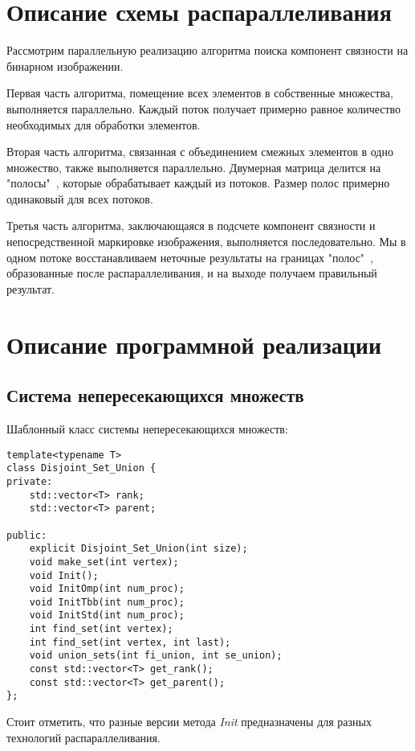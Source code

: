 \documentclass{report}
\begin{document}

\newpage
\section*{Описание схемы распараллеливания}
\par Рассмотрим параллельную реализацию алгоритма поиска компонент связности на бинарном изображении.
\par Первая часть алгоритма, помещение всех элементов в собственные множества, выполняется параллельно. Каждый поток получает примерно равное количество необходимых для обработки элементов.
\par Вторая часть алгоритма, связанная с объединением смежных элементов в одно множество, также выполняется параллельно. Двумерная матрица делится на "полосы"\ , которые обрабатывает каждый из потоков. Размер полос примерно одинаковый для всех потоков.
\par Третья часть алгоритма, заключающаяся в подсчете компонент связности и непосредственной маркировке изображения, выполняется последовательно. Мы в одном потоке восстанавливаем неточные результаты на границах "полос"\ , образованные после распараллеливания, и на выходе получаем правильный результат.

\newpage
\section*{Описание программной реализации}
\subsection*{Система непересекающихся множеств}
\par Шаблонный класс системы непересекающихся множеств:
\begin{lstlisting}
template<typename T>
class Disjoint_Set_Union {
private:
    std::vector<T> rank;
    std::vector<T> parent;

public:
    explicit Disjoint_Set_Union(int size);
    void make_set(int vertex);
    void Init();
    void InitOmp(int num_proc);
    void InitTbb(int num_proc);
    void InitStd(int num_proc);
    int find_set(int vertex);
    int find_set(int vertex, int last);
    void union_sets(int fi_union, int se_union);
    const std::vector<T> get_rank();
    const std::vector<T> get_parent();
};
\end{lstlisting}
\par Стоит отметить, что разные версии метода \textit{Init} предназначены для разных технологий распараллеливания.
\end{document}
